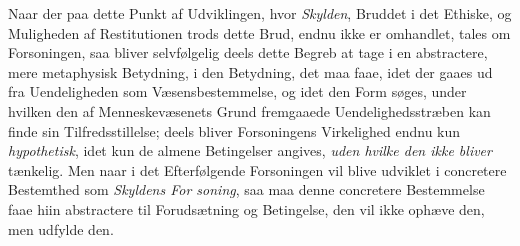 Naar der paa dette Punkt af Udviklingen, hvor \emph{Skylden}, Bruddet i det
Ethiske, og Muligheden af Restitutionen trods dette Brud, endnu ikke er omhandlet,
tales om Forsoningen, saa bliver selvfølgelig deels dette Begreb at tage i en
abstractere, mere metaphysisk Betydning, i den Betydning, det maa faae, idet der
gaaes ud fra Uendeligheden som Væsensbestemmelse, og idet den Form søges, under
hvilken den af Menneskevæsenets Grund fremgaaede Uendelighedsstræben kan finde sin
Tilfredsstillelse; deels bliver Forsoningens Virkelighed endnu kun
\emph{hypothetisk}, idet kun de almene Betingelser angives, \emph{uden hvilke den
ikke bliver} tænkelig. Men naar i det Efterfølgende Forsoningen vil blive udviklet
i concretere Bestemthed som \emph{Skyldens For\-%
soning}, saa maa denne concretere Bestemmelse faae hiin abstractere til
Forudsætning og Betingelse, den vil ikke ophæve den, men udfylde den.

